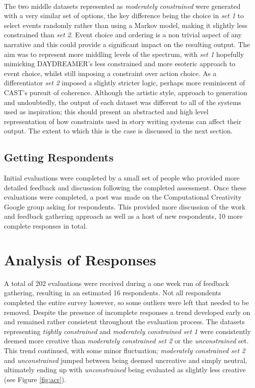 \documentclass[letterpaper]{article}
\begin{document}
\\The two middle datasets represented as \emph{moderately constrained} were generated with a very similar set of options, the key difference being the choice in \emph{set 1} to select events randomly rather than using a Markov model, making it slightly less constrained than \emph{set 2}. Event choice and ordering is a non trivial aspect of any narrative and this could provide a significant impact on the resulting output. The aim was to represent more middling levels of the spectrum, with \emph{set 1} hopefully mimicking DAYDREAMER's less constrained and more esoteric approach to event choice, whilst still imposing a constraint over action choice. As a differentiator \emph{set 2} imposed a slightly stricter logic, perhaps more reminiscent of CAST's pursuit of coherence. Although the artistic style, approach to generation and undoubtedly, the output of each dataset was different to all of the systems used as inspiration; this should present an abstracted and high level representation of how constraints used in story writing systems can affect their output. The extent to which this is the case is discussed in the next section.

\subsection{Getting Respondents}
Initial evaluations were completed by a small set of people who provided more detailed feedback and discussion following the completed assessment. Once these evaluations were completed, a post was made on the Computational Creativity Google group asking for respondents. This provided more discussion of the work and feedback gathering approach as well as a host of new respondents, 10 more complete responses in total. 

\section{Analysis of Responses}
A total of 202 evaluations were received during a one week run of feedback gathering, resulting in an estimated 16 respondents. Not all respondents completed the entire survey however, so some outliers were left that needed to be removed. 
Despite the presence of incomplete responses a trend developed early on and remained rather consistent throughout the evaluation process. The datasets representing \emph{tightly constrained} and \emph{moderately constrained set 1} were consistently deemed more creative than \emph{moderately constrained set 2} or the \emph{unconstrained} set. This trend continued, with some minor fluctuation; \emph{moderately constrained set 2} and \emph{unconstrained} jumped between being deemed uncreative and simply neutral,  ultimately ending up with \emph{unconstrained} being evaluated as slightly less creative (see Figure \ref{fig:acr}). 
\end{document}
